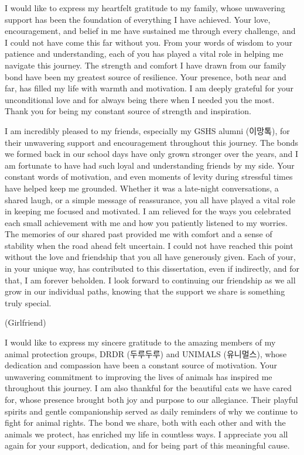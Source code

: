 \documentclass[11pt, a4paper, onecolumn, oneside]{report}
\begin{document}
        I would like to express my heartfelt gratitude to my family, whose unwavering support has been the foundation of everything I have achieved. Your love, encouragement, and belief in me have sustained me through every challenge, and I could not have come this far without you. From your words of wisdom to your patience and understanding, each of you has played a vital role in helping me navigate this journey. The strength and comfort I have drawn from our family bond have been my greatest source of resilience. Your presence, both near and far, has filled my life with warmth and motivation. I am deeply grateful for your unconditional love and for always being there when I needed you the most. Thank you for being my constant source of strength and inspiration.

        I am incredibly pleased to my friends, especially my GSHS alumni (이망톡), for their unwavering support and encouragement throughout this journey. The bonds we formed back in our school days have only grown stronger over the years, and I am fortunate to have had such loyal and understanding friends by my side. Your constant words of motivation, and even moments of levity during stressful times have helped keep me grounded. Whether it was a late-night conversations, a shared laugh, or a simple message of reassurance, you all have played a vital role in keeping me focused and motivated. I am relieved for the ways you celebrated each small achievement with me and how you patiently listened to my worries. The memories of our shared past provided me with comfort and a sense of stability when the road ahead felt uncertain. I could not have reached this point without the love and friendship that you all have generously given. Each of your, in your unique way, has contributed to this dissertation, even if indirectly, and for that, I am forever beholden. I look forward to continuing our friendship as we all grow in our individual paths, knowing that the support we share is something truly special.

        (Girlfriend)

        I would like to express my sincere gratitude to the amazing members of my animal protection groups, DRDR (두루두루) and UNIMALS (유니멀스), whose dedication and compassion have been a constant source of motivation. Your unwavering commitment to improving the lives of animals has inspired me throughout this journey. I am also thankful for the beautiful cats we have cared for, whose presence brought both joy and purpose to our allegiance. Their playful spirits and gentle companionship served as daily reminders of why we continue to fight for animal rights. The bond we share, both with each other and with the animals we protect, has enriched my life in countless ways. I appreciate you all again for your support, dedication, and for being part of this meaningful cause.
\end{document}
